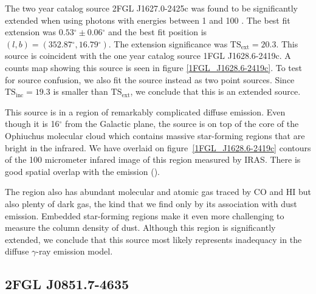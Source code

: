 \documentclass[12pt,preprint]{aastex}
\newcommand{\gev}{\text{GeV}\xspace}
\newcommand{\tsext}{{\ensuremath{\text{TS}_\text{ext}}}\xspace}
\newcommand{\tsinc}{\ensuremath{\text{TS}_\text{inc}}\xspace}
\renewcommand{\deg}{\ensuremath{^\circ}\xspace}
\begin{document}

The two year catalog source 2FGL J1627.0-2425c was found to be
significantly extended when using photons with energies between 1 \gev
and 100 \gev.  The best fit extension was $0.53\deg\pm0.06\deg$ and the
best fit position is $(l,b)=(352.87\deg, 16.79\deg)$.
The extension significance was $\tsext=20.3$. 
This source is coincident with the one year catalog source 1FGL J1628.6-2419c.
A counts map showing this source is
seen in figure \ref{1FGL_J1628.6-2419c}.  To test for source confusion,
we also fit the source instead as two point sources. Since $\tsinc=19.3$
is smaller than \tsext, we conclude that this is an extended source.

This source is in a region of remarkably complicated diffuse emission.
Even though it is 16\deg from the Galactic plane, the source is on top
of the core of the Ophiuchus molecular cloud which contains massive
star-forming regions that are bright in the infrared.  We have overlaid
on figure~\ref{1FGL_J1628.6-2419c} contours of the 100 micrometer infared
image of this region measured by IRAS. There is good spatial overlap
with the \gev emission (\cite{iras_rho_ophiuci}).

The region also has abundant molecular and atomic gas traced by CO
and HI but also plenty of dark gas, the kind that we find only by its
association with dust emission. Embedded star-forming regions make it even
more challenging to measure the column density of dust.  Although this
region is significantly extended, we conclude that this source most
likely represents inadequacy in the diffuse $\gamma$-ray emission model.


\subsection{2FGL J0851.7-4635}
\label{section_2FGL_J0851.7-4635}

\end{document}
